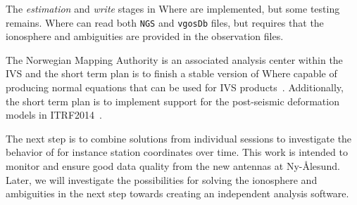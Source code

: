 \documentclass[natbib,twocolumn,twoside]{svmultiag}
\begin{document}
The \emph{estimation} and \emph{write} stages in Where are implemented, but some
testing remains. Where can read both \texttt{NGS} and \texttt{vgosDb} files, but
requires that the ionosphere and ambiguities are provided in the observation
files.

The Norwegian Mapping Authority is an associated analysis center within the IVS
and the short term plan is to finish a stable version of Where capable of
producing normal equations that can be used for IVS products~\citep{ivs}.
Additionally, the short term plan is to implement support for the post-seismic
deformation models in ITRF2014~\citep{itrf2014}.

The next step is to combine solutions from individual sessions to investigate
the behavior of for instance station coordinates over time. This work is
intended to monitor and ensure good data quality from the new antennas at
Ny-{\AA}lesund. Later, we will investigate the possibilities for solving the
ionosphere and ambiguities in the next step towards creating an independent
analysis software.
\end{document}
